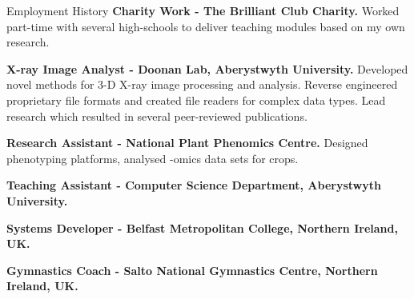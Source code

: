 \begin{rubric}{Employment History}
%
	\textbf{Charity Work - The Brilliant Club Charity.}  Worked part-time with several high-schools to deliver teaching modules
	based on my own research. 

\entry*[2017 -- 2018]%
	\textbf{X-ray Image Analyst - Doonan Lab, Aberystwyth University.} Developed
	novel methods for 3-D X-ray image processing and analysis. Reverse
	engineered proprietary file formats and created file readers for complex
	data types. Lead research which resulted in several peer-reviewed
	publications.  

\entry*[2016 -- 2017]%
	\textbf{Research Assistant - National Plant Phenomics Centre.} Designed
	phenotyping platforms, analysed -omics data sets for crops.

\entry*[2015 -- 2018]%
	\textbf{Teaching Assistant - Computer Science Department, Aberystwyth
	University.}  
	
\entry*[2013 -- 2014]%
	\textbf{Systems Developer - Belfast Metropolitan College, Northern Ireland, UK.} 

\entry*[2010 -- 2014]%
	\textbf{Gymnastics Coach - Salto National Gymnastics Centre, Northern Ireland, UK.} 
%
\end{rubric}